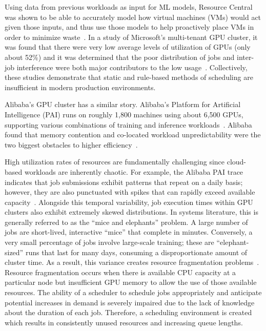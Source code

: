 \clearpage
Using data from previous workloads as input for ML models, Resource Central was shown to be able to accurately model how virtual machines (VMs) would act given those inputs, and thus use those models to help proactively place VMs in order to minimize waste~\cite{cortez2017resource}. In a study of Microsoft's multi-tenant GPU cluster, it was found that there were very low average levels of utilization of GPUs (only about 52\%) and it was determined that the poor distribution of jobs and inter-job interference were both major contributors to the low usage~\cite{jeon2019analysis}. Collectively, these studies demonstrate that static and rule-based methods of scheduling are insufficient in modern production environments.

Alibaba's GPU cluster has a similar story. Alibaba's Platform for Artificial Intelligence (PAI) runs on roughly 1,800 machines using about 6,500 GPUs, supporting various combinations of training and inference workloads~\cite{weng2022mlaas}. Alibaba found that memory contention and co-located workload unpredictability were the two biggest obstacles to higher efficiency~\cite{guo2019limits}.

High utilization rates of resources are fundamentally challenging since cloud-based workloads are inherently chaotic. For example, the Alibaba PAI trace indicates that job submissions exhibit patterns that repeat on a daily basis; however, they are also punctuated with spikes that can rapidly exceed available capacity~\cite{weng2022mlaas}. Alongside this temporal variability, job execution times within GPU clusters also exhibit extremely skewed distributions. In systems literature, this is generally referred to as the ``mice and elephants'' problem. A large number of jobs are short-lived, interactive ``mice'' that complete in minutes. Conversely, a very small percentage of jobs involve large-scale training; these are ``elephant-sized'' runs that last for many days, consuming a disproportionate amount of cluster time. As a result, this variance creates resource fragmentation problems~\cite{weng2023beware}. Resource fragmentation occurs when there is available CPU capacity at a particular node but insufficient GPU memory to allow the use of those available resources. The ability of a scheduler to schedule jobs appropriately and anticipate potential increases in demand is severely impaired due to the lack of knowledge about the duration of each job. Therefore, a scheduling environment is created which results in consistently unused resources and increasing queue lengths.

